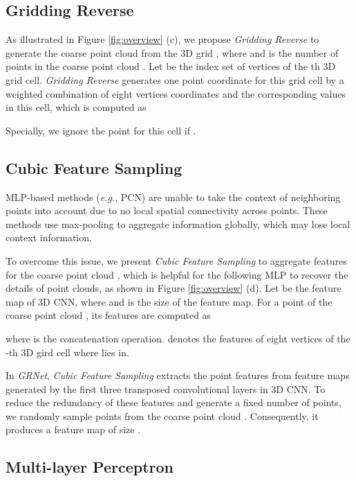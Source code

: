 \documentclass[runningheads]{llncs}
\begin{document}
\subsection{Gridding Reverse}
\label{sec:gridding-reverse}

As illustrated in Figure \ref{fig:overview} (c), we propose {\it Gridding Reverse} to generate the coarse point cloud  from the 3D grid , where  and  is the number of points in the coarse point cloud .
Let  be the index set of vertices of the th 3D grid cell.
{\it Gridding Reverse} generates one point coordinate  for this grid cell by a weighted combination of eight vertices coordinates  and the corresponding values  in this cell, which is computed as

Specially, we ignore the point  for this cell if .

\subsection{Cubic Feature Sampling}
\label{sec:cubic-feature-sampling}

MLP-based methods ({\it e.g.}, PCN) are unable to take the context of neighboring points into account due to no local spatial connectivity across points.
These methods use max-pooling to aggregate information globally, which may lose local context information.

To overcome this issue, we present {\it Cubic Feature Sampling} to aggregate features  for the coarse point cloud , which is helpful for the following MLP to recover the details of point clouds, as shown in Figure \ref{fig:overview} (d).
Let  be the feature map of 3D CNN, where  and  is the size of the feature map.
For a point  of the coarse point cloud , its features  are computed as

where  is the concatenation operation.
 denotes the features of eight vertices of the -th 3D gird cell where  lies in.

In {\it GRNet}, {\it Cubic Feature Sampling} extracts the point features from feature maps generated by the first three transposed convolutional layers in 3D CNN.
To reduce the redundancy of these features and generate a fixed number of points, we randomly sample  points from the coarse point cloud .
Consequently, it produces a feature map of size .

\subsection{Multi-layer Perceptron}
\label{sec:mlp}
\end{document}

